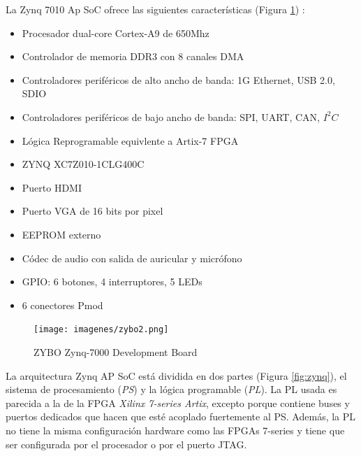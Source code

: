 La Zynq 7010 Ap SoC ofrece las siguientes características (Figura \ref{fig:zybo}) \cite{manual_zybo}:
\begin{itemize}
    \item Procesador dual-core Cortex-A9 de 650Mhz
    \item Controlador de memoria DDR3 con 8 canales DMA
    \item Controladores periféricos de alto ancho de banda: 1G Ethernet, USB 2.0, SDIO
    \item Controladores periféricos de bajo ancho de banda: SPI, UART, CAN, \(I^2C\)
    \item Lógica Reprogramable equivlente a Artix-7 FPGA
    \item ZYNQ XC7Z010-1CLG400C
    \item Puerto HDMI
    \item Puerto VGA de 16 bits por pixel
    \item EEPROM externo
    \item Códec de audio con salida de auricular y micrófono 
    \item GPIO: 6 botones, 4 interruptores, 5 LEDs
    \item 6 conectores Pmod
\end{itemize}

\begin{figure}
    \centering
    \texttt{[image: imagenes/zybo2.png]}
    \caption{ZYBO Zynq-7000 Development Board}\label{fig:zybo}
\end{figure}

La arquitectura Zynq AP SoC está dividida en dos partes (Figura \ref{fig:zynq}), el sistema de procesamiento (\textit{PS}) y la lógica programable (\textit{PL}). 
La PL usada es parecida a la de la FPGA \textit{Xilinx 7-series Artix}, excepto porque contiene buses y puertos dedicados que hacen que esté 
acoplado fuertemente al PS. Además, la PL no tiene la misma configuración hardware como las FPGAs 7-series y tiene que ser configurada 
por el procesador o por el puerto JTAG.

